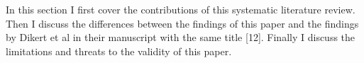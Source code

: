 In this section I first cover the contributions of this systematic
literature review. Then I discuss the differences between the findings
of this paper and the findings by Dikert et al in their manuscript with
the same title [12]. Finally I discuss the limitations and threats to
the validity of this paper.

